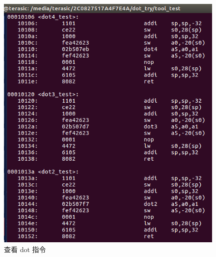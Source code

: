 \documentclass[a4paper, 14pt, oneside]{book} %
\numberwithin{equation}{subsection}
\begin{document}
\begin{itemize}
\begin{figure}[H]
						\includegraphics[scale=0.7]{img/7.png} 
						\caption{查看 dot 指令}
					\end{figure}		
			\end{itemize}
\end{document}
